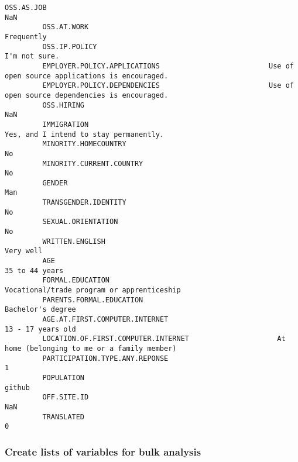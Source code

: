 \documentclass[11pt]{article}
\begin{document}
\begin{Verbatim}[commandchars=\\\{\}]
         OSS.AS.JOB                                                                                       NaN  
         OSS.AT.WORK                                                                               Frequently  
         OSS.IP.POLICY                                                                          I'm not sure.  
         EMPLOYER.POLICY.APPLICATIONS                          Use of open source applications is encouraged.  
         EMPLOYER.POLICY.DEPENDENCIES                          Use of open source dependencies is encouraged.  
         OSS.HIRING                                                                                       NaN  
         IMMIGRATION                                                   Yes, and I intend to stay permanently.  
         MINORITY.HOMECOUNTRY                                                                              No  
         MINORITY.CURRENT.COUNTRY                                                                          No  
         GENDER                                                                                           Man  
         TRANSGENDER.IDENTITY                                                                              No  
         SEXUAL.ORIENTATION                                                                                No  
         WRITTEN.ENGLISH                                                                            Very well  
         AGE                                                                                   35 to 44 years  
         FORMAL.EDUCATION                                          Vocational/trade program or apprenticeship  
         PARENTS.FORMAL.EDUCATION                                                           Bachelor's degree  
         AGE.AT.FIRST.COMPUTER.INTERNET                                                     13 - 17 years old  
         LOCATION.OF.FIRST.COMPUTER.INTERNET                     At home (belonging to me or a family member)  
         PARTICIPATION.TYPE.ANY.REPONSE                                                                     1  
         POPULATION                                                                                    github  
         OFF.SITE.ID                                                                                      NaN  
         TRANSLATED                                                                                         0  
\end{Verbatim}
        
    \subsubsection{Create lists of variables for bulk
analysis}\label{create-lists-of-variables-for-bulk-analysis}
\end{document}
